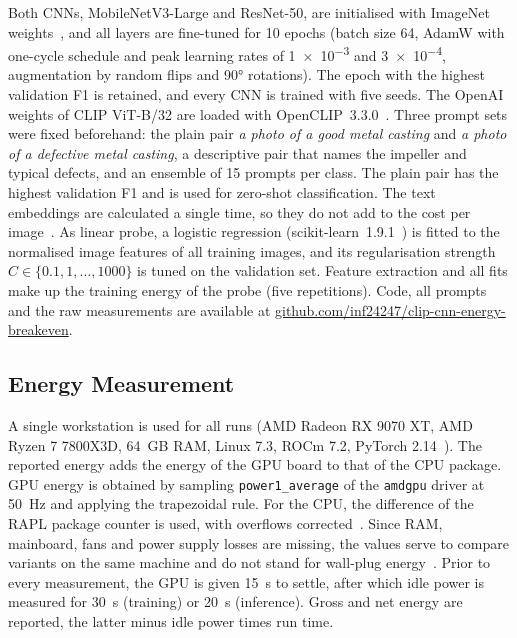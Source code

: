 \documentclass[conference]{IEEEtran}
\begin{document}
Both CNNs, MobileNetV3-Large and ResNet-50, are initialised with ImageNet
weights~\cite{russakovsky2015ilsvrc}, and all layers are fine-tuned for 10 epochs (batch size 64,
AdamW with one-cycle schedule and peak learning rates of \num{1e-3} and \num{3e-4}, augmentation by
random flips and \ang{90} rotations). The epoch with the highest validation F1 is retained, and every
CNN is trained with five seeds. The OpenAI weights of CLIP ViT-B/32 are loaded with
OpenCLIP~3.3.0~\cite{ilharco2021openclip}. Three prompt sets were fixed beforehand: the plain pair
\emph{a photo of a good metal casting} and \emph{a photo of a defective metal casting}, a descriptive
pair that names the impeller and typical defects, and an ensemble of 15 prompts per class. The plain
pair has the highest validation F1 and is used for zero-shot classification. The text embeddings are
calculated a single time, so they do not add to the cost per image~\cite{radford2021clip}. As linear
probe, a logistic regression (scikit-learn~1.9.1~\cite{pedregosa2011sklearn}) is fitted to the
normalised image features of all training images, and its regularisation strength
$C\in\{0.1,1,\dots,1000\}$ is tuned on the validation set. Feature extraction and all fits make up the
training energy of the probe (five repetitions). Code, all prompts and the raw measurements are
available at \url{github.com/inf24247/clip-cnn-energy-breakeven}.

\subsection{Energy Measurement}
A single workstation is used for all runs (AMD Radeon RX 9070 XT, AMD Ryzen 7 7800X3D, \SI{64}{GB} RAM,
Linux 7.3, ROCm 7.2, PyTorch 2.14~\cite{paszke2019pytorch}). The reported energy adds the energy of the
GPU board to that of the CPU package. GPU energy is obtained by sampling \texttt{power1\_average} of the
\texttt{amdgpu} driver at \SI{50}{Hz} and applying the trapezoidal rule. For the CPU, the difference of the RAPL
package counter is used, with overflows corrected~\cite{raffin2025rapl}. Since
RAM, mainboard, fans and power supply losses are missing, the values serve to
compare variants on the same machine and do not stand for wall-plug
energy~\cite{jay2023softwaremeters,schoene2021zen2}. Prior to every measurement, the GPU is given
\SI{15}{s} to settle, after which idle power is measured for \SI{30}{s} (training) or \SI{20}{s}
(inference). Gross and net energy are reported, the latter minus idle power times run time.
\end{document}
